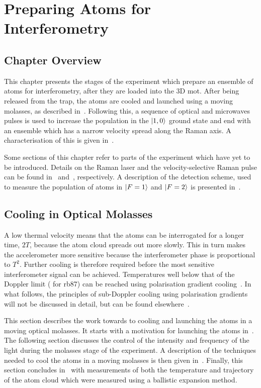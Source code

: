 \chapter{Preparing Atoms for Interferometry}\label{chap:atom_prep}
\section{Chapter Overview}
This chapter presents the stages of the experiment which prepare an
ensemble of atoms for interferometry, after they are loaded into the
3D \ac{mot}. After being released from the trap, the atoms are cooled
and launched using a moving molasses, as described
in~. Following this, a sequence of
optical and microwaves pulses is used to increase the population in
the \(\ket{1,0}\) ground state and end with an ensemble which has a
narrow velocity spread along the Raman axis. A characterisation of
this is given in~.
\par\noindent
Some sections of this chapter refer to parts of the experiment which
have yet to be introduced. Details on the Raman laser and the
velocity-selective Raman pulse can be found
in~
and~, respectively. A
description of the detection scheme, used to measure the population of
atoms in \(\ket{F=1}\) and \(\ket{F=2}\) is presented
in~.

\section{Cooling in Optical Molasses}\label{sec:optical_molasses}
A low thermal velocity means that the atoms can be interrogated for a
longer time, $2T$, because the atom cloud spreads out more slowly.
This in turn makes the accelerometer more sensitive because the
interferometer phase is proportional to $T^2$. 
Further cooling is therefore required before the most sensitive
interferometer signal can be achieved. Temperatures well below that of
the Doppler limit ( for \ac{rb87}) can be
reached using polarisation gradient cooling~\cite{Salomon1990}. In what follows, the principles of
sub-Doppler cooling using polarisation gradients will not be discussed
in detail, but can be found elsewhere~\cite{Dalibard1989,Berg-Sorensent1992}. 

\par\noindent
This section describes the work towards to cooling and launching the
atoms in a moving optical molasses. It starts with a motivation for
launching the atoms in~. The following
section discusses the control of the intensity and frequency of the
light during the molasses stage of the experiment. A description of
the techniques needed to cool the atoms in a moving molasses is then
given in~. Finally, this section
concludes in~ with measurements of
both the temperature and trajectory of the atom cloud which were
measured using a ballistic expansion method.


